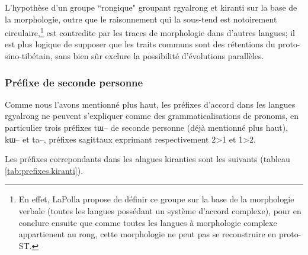\documentclass[oldfontcommands,oneside,a4paper,11pt]{memoir}
\begin{document}
L'hypothèse d'un groupe ``rongique" groupant rgyalrong et kiranti sur la base de la morphologie, outre que le raisonnement qui la sous-tend est notoirement circulaire,\footnote{En effet, LaPolla propose de définir ce groupe sur la base de la morphologie verbale (toutes les langues possédant un système d'accord complexe), pour en conclure ensuite que comme toutes les langues à morphologie complexe appartienent au rong, cette morphologie ne peut pas se reconstruire en proto-ST. } est contredite par les traces de morphologie dans d'autres langues; il est plus logique de supposer que les traits communs sont des rétentions du proto-sino-tibétain, sans bien sûr exclure la possibilité d'évolutions parallèles.







\subsubsection{Préfixe de seconde personne}
Comme nous l'avons mentionné plus haut, les préfixes d'accord dans les langues rgyalrong ne peuvent s'expliquer comme des grammaticalisations de pronoms, en particulier  trois préfixes  tɯ-- de seconde personne (déjà mentionné plus haut), kɯ-- et ta--, préfixes sagittaux exprimant respectivement 2>1 et 1>2. 

Les préfixes correpondants dans les alngues kiranties sont les suivants (tableau \ref{tab:prefixes.kiranti}).
\end{document}
